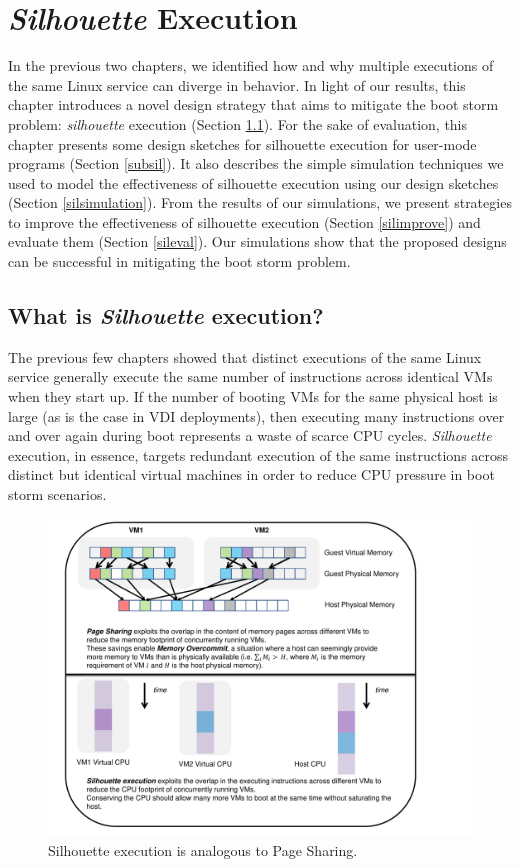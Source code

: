 \chapter{{\em Silhouette} Execution} \label{ch:sil}
In the previous two chapters,
we identified how and why
multiple executions of the same
Linux service can diverge in behavior.
In light of our results, this chapter introduces a 
novel design strategy that aims to mitigate the boot storm problem:
{\em silhouette} execution (Section \ref{def:sil}).
For the sake of evaluation, this chapter
presents some design sketches for silhouette
execution for user-mode programs (Section \ref{subsil}).
It also describes the simple simulation techniques we used 
to model the effectiveness of silhouette
execution using our design sketches
(Section \ref{silsimulation}).
From the results of our simulations, we present strategies
to improve the effectiveness of
silhouette execution (Section \ref{silimprove})
and evaluate them (Section \ref{sileval}).
Our simulations show that the proposed designs can be successful
in mitigating the boot storm problem. 

\section{What is {\em Silhouette} execution?} \label{def:sil}
The previous few chapters showed that
distinct executions of the same Linux service
generally execute the same number of instructions
across identical VMs when they start up. If the number of booting VMs for
the same physical host is large (as is 
the case in VDI deployments),
then executing many instructions over
and over again during boot represents a waste of scarce CPU cycles.
{\em Silhouette} execution, in essence, targets
redundant execution of the same instructions across distinct but
identical virtual machines in order to reduce CPU pressure in boot storm
scenarios. 

\newpage
\begin{figure} []
  \centering
  \includegraphics[scale=0.8, trim=2cm 0cm -5cm 0cm]{overcommit.pdf}
  \caption[Silhouette execution is analogous to Page Sharing.]%
          {Silhouette execution is analogous to Page Sharing.}

  \label{silconcept}
\end{figure}

